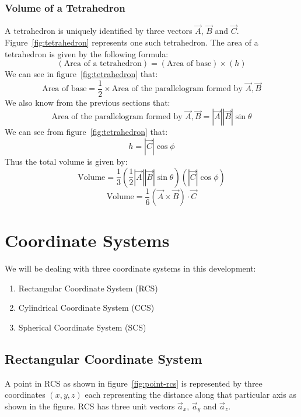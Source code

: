             \subsubsection{Volume of a Tetrahedron}
                
                A tetrahedron is uniquely identified by three vectors $\vec{A}$, $\vec{B}$ and $\vec{C}$. Figure~\ref{fig:tetrahedron} represents one such tetrahedron. The area of a tetrahedron is given by the following formula:
                $$\left(\textrm{Area of a tetrahedron}\right)=\left(\textrm{Area of base}\right)\times(h)$$
                We can see in figure~\ref{fig:tetrahedron} that:
                $$\textrm{Area of base} = \frac{1}{2}\times\textrm{Area of the parallelogram formed by }\vec{A}, \vec{B}$$
                We also know from the previous sections that:
                $$\textrm{Area of the parallelogram formed by }\vec{A}, \vec{B} = |\vec{A}||\vec{B}|\sin\theta$$
                We can see from figure~\ref{fig:tetrahedron} that:
                $$h = |\vec{C}|\cos\phi$$
                Thus the total volume is given by:
                $$\textrm{Volume} = \frac{1}{3}\left(\frac{1}{2}|\vec{A}||\vec{B}|\sin\theta\right)\left(|\vec{C}|\cos\phi\right)$$
                $$\textrm{Volume} = \frac{1}{6}\left(\vec{A}\times\vec{B}\right)\cdot\vec{C}$$
    \section{Coordinate Systems}
        We will be dealing with three coordinate systems in this development:
        \begin{enumerate}
            \item Rectangular Coordinate System (RCS)
            \item Cylindrical Coordinate System (CCS)
            \item Spherical Coordinate System (SCS)
        \end{enumerate}
        \subsection{Rectangular Coordinate System}
            
            A point in RCS as shown in figure~\ref{fig:point-rcs} is represented by three coordinates $\left(x, y, z\right)$ each representing the distance along that particular axis as shown in the figure. RCS has three unit vectors $\vec{a}_x$, $\vec{a}_y$ and $\vec{a}_z$.
